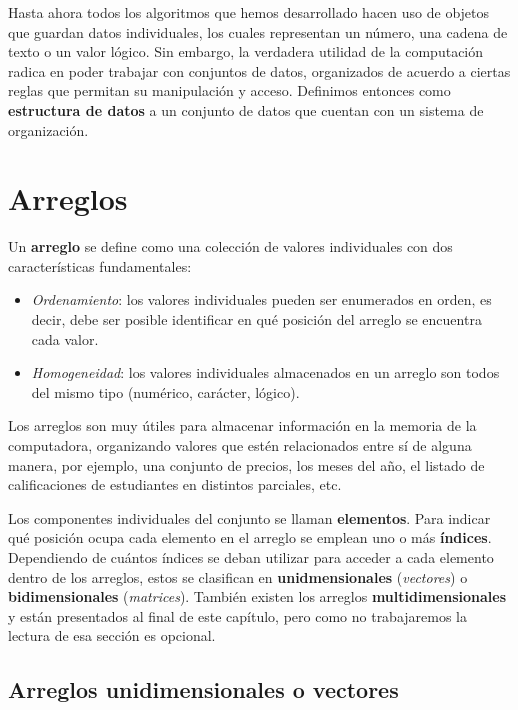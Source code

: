 \documentclass[
]{book}
\providecommand{\tightlist}{%
  \setlength{\itemsep}{0pt}\setlength{\parskip}{0pt}}
\begin{document}
Hasta ahora todos los algoritmos que hemos desarrollado hacen uso de objetos que guardan datos individuales, los cuales representan un número, una cadena de texto o un valor lógico. Sin embargo, la verdadera utilidad de la computación radica en poder trabajar con conjuntos de datos, organizados de acuerdo a ciertas reglas que permitan su manipulación y acceso. Definimos entonces como \textbf{estructura de datos} a un conjunto de datos que cuentan con un sistema de organización.

\hypertarget{arreglos}{%
\section{Arreglos}\label{arreglos}}

Un \textbf{arreglo} se define como una colección de valores individuales con dos características fundamentales:

\begin{itemize}
\tightlist
\item
  \emph{Ordenamiento}: los valores individuales pueden ser enumerados en orden, es decir, debe ser posible identificar en qué posición del arreglo se encuentra cada valor.
\item
  \emph{Homogeneidad}: los valores individuales almacenados en un arreglo son todos del mismo tipo (numérico, carácter, lógico).
\end{itemize}

Los arreglos son muy útiles para almacenar información en la memoria de la computadora, organizando valores que estén relacionados entre sí de alguna manera, por ejemplo, una conjunto de precios, los meses del año, el listado de calificaciones de estudiantes en distintos parciales, etc.

Los componentes individuales del conjunto se llaman \textbf{elementos}. Para indicar qué posición ocupa cada elemento en el arreglo se emplean uno o más \textbf{índices}. Dependiendo de cuántos índices se deban utilizar para acceder a cada elemento dentro de los arreglos, estos se clasifican en \textbf{unidmensionales} (\emph{vectores}) o \textbf{bidimensionales} (\emph{matrices}). También existen los arreglos \textbf{multidimensionales} y están presentados al final de este capítulo, pero como no trabajaremos la lectura de esa sección es opcional.

\hypertarget{arreglos-unidimensionales-o-vectores}{%
\subsection{Arreglos unidimensionales o vectores}\label{arreglos-unidimensionales-o-vectores}}
\end{document}
